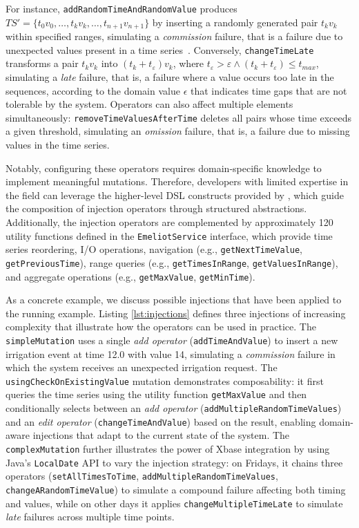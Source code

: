 For instance, \texttt{addRandomTimeAndRandomValue} produces $TS' = \{t_0 v_0, \ldots, t_k v_k, \ldots, t_{n+1} v_{n+1}\}$ by inserting a randomly generated pair $t_k v_k$  within specified ranges, simulating a \textit{commission} failure, that is a failure due to unexpected values present in a time series~\citep{10350526}. Conversely, \texttt{changeTimeLate} transforms a pair $t_k v_k$ into $(t_k + t_\varepsilon) v_k$, where $t_\varepsilon > \varepsilon \land (t_k + t_\varepsilon) \leq t_{max}$, simulating a \textit{late} failure, that is, a failure where a value occurs too late in the sequences, according to the domain value $\epsilon$ that indicates time gaps that are not tolerable by the system. Operators can also affect multiple elements simultaneously: \texttt{removeTimeValuesAfterTime} deletes all pairs whose time exceeds a given threshold, simulating an \textit{omission} failure, that is, a failure due to missing values in the time series. %

Notably, configuring these operators requires domain-specific knowledge to implement meaningful mutations. Therefore, developers with limited expertise in the field can leverage the higher-level DSL constructs provided by \tool, which guide the composition of injection operators through structured abstractions.
Additionally, the injection operators are complemented by approximately 120 utility functions defined in the \texttt{EmeliotService} interface, which provide time series reordering, I/O operations, navigation (e.g., \texttt{getNextTimeValue}, \texttt{getPreviousTime}), range queries (e.g., \texttt{getTimesInRange}, \texttt{getValuesInRange}), and aggregate operations (e.g., \texttt{getMaxValue}, \texttt{getMinTime}).

As a concrete example, we discuss possible injections that have been applied to the running example. Listing \ref{lst:injections} defines three injections of increasing complexity that illustrate how the operators can be used in practice. The \texttt{simpleMutation} uses a single \textit{add operator} (\texttt{addTimeAndValue}) to insert a new irrigation event at time 12.0 with value 14, simulating a \textit{commission} failure in which the system receives an unexpected irrigation request. The \texttt{usingCheckOnExistingValue} mutation demonstrates composability: it first queries the time series using the utility function \texttt{getMaxValue} and then conditionally selects between an \textit{add operator} (\texttt{addMultipleRandomTimeValues}) and an \textit{edit operator} (\texttt{changeTimeAndValue}) based on the result, enabling domain-aware injections that adapt to the current state of the system. The \texttt{complexMutation} further illustrates the power of Xbase integration by using Java's \texttt{LocalDate} API to vary the injection strategy: on Fridays, it chains three operators (\texttt{setAllTimesToTime}, \texttt{addMultipleRandomTimeValues}, \texttt{changeARandomTimeValue}) to simulate a compound failure affecting both timing and values, while on other days it applies \texttt{changeMultipleTimeLate} to simulate \textit{late} failures across multiple time points.



